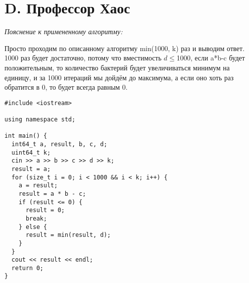 \section{D. Профессор Хаос}
\textit{Пояснение к примененному алгоритму:} \par
Просто проходим по описанному алгоритму min(1000, k) раз и выводим ответ.
1000 раз будет достаточно, потому что вместимость $d \leqslant $1000, если a*b-c будет положительным,
то количество бактерий будет увеличиваться минимум на единицу, и за 1000 итераций мы дойдём до максимума,
а если оно хоть раз обратится в 0, то будет всегда равным 0.
\tiny
\begin{verbatim}
#include <iostream>

using namespace std;

int main() {
  int64_t a, result, b, c, d;
  uint64_t k;
  cin >> a >> b >> c >> d >> k;
  result = a;
  for (size_t i = 0; i < 1000 && i < k; i++) {
    a = result;
    result = a * b - c;
    if (result <= 0) {
      result = 0;
      break;
    } else {
      result = min(result, d);
    }
  }
  cout << result << endl;
  return 0;
}
\end{verbatim}
\BgThispage

